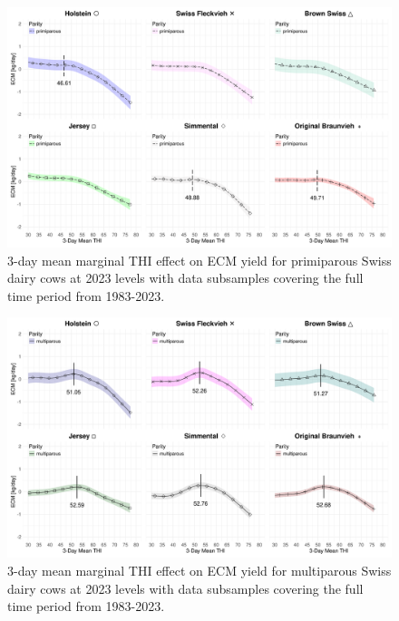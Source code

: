 \begin{figure}[H]
    \centering
    \includegraphics[width=\textwidth]{thesis/figures/results/ecm_yield_marginal_primi.png}
    \caption{3-day mean marginal THI effect on ECM yield for primiparous Swiss dairy cows at 2023 levels with data subsamples covering the full time period from 1983-2023.}
    \label{fig:results_ecm_marginal_parimiprous}
\end{figure}

\begin{figure}[H]
    \centering
    \includegraphics[width=\textwidth]{thesis/figures/results/ecm_yield_marginal_multi.png}
    
    \caption{3-day mean marginal THI effect on ECM yield for multiparous Swiss dairy cows at 2023 levels with data subsamples covering the full time period from 1983-2023.}
    \label{fig:results_ecm_marginal_multiparous}
\end{figure}



